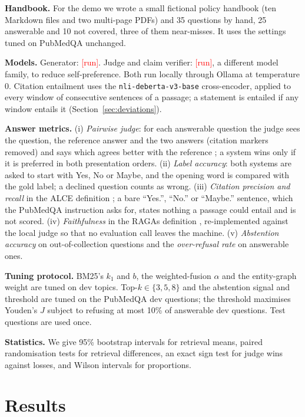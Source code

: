 \documentclass[11pt]{article}
\newcommand{\pending}{\textcolor{red}{[run]}}
\providecommand{\GeneratorModel}{\pending}\providecommand{\JudgeModel}{\pending}
\begin{document}
\textbf{Handbook.} For the demo we wrote a small fictional policy handbook (ten Markdown
files and two multi-page PDFs) and 35 questions by hand, 25 answerable and 10 not covered,
three of them near-misses. It uses the settings tuned on PubMedQA unchanged.

\textbf{Models.} Generator: \GeneratorModel. Judge and claim verifier: \JudgeModel, a
different model family, to reduce self-preference. Both run locally through Ollama at
temperature 0. Citation entailment uses the \texttt{nli-deberta-v3-base} cross-encoder, applied
to every window of \NliWindow{} consecutive sentences of a passage; a statement is entailed if
any window entails it (Section~\ref{sec:deviations}).

\textbf{Answer metrics.} (i) \emph{Pairwise judge}: for each answerable question the judge
sees the question, the reference answer and the two answers (citation markers removed) and
says which agrees better with the reference \citep{zheng2023judging}; a system wins only if
it is preferred in both presentation orders. (ii) \emph{Label accuracy}: both systems are
asked to start with Yes, No or Maybe, and the opening word is compared with the gold label; a
declined question counts as wrong. (iii) \emph{Citation precision and recall} in the ALCE
definition \citep{gao2023alce}; a bare ``Yes.'', ``No.'' or ``Maybe.'' sentence, which the
PubMedQA instruction asks for, states nothing a passage could entail and is not scored. (iv) \emph{Faithfulness} in the RAGAs definition
\citep{es2024ragas}, re-implemented against the local judge so that no evaluation call leaves
the machine. (v) \emph{Abstention accuracy} on out-of-collection questions and the
\emph{over-refusal rate} on answerable ones.

\textbf{Tuning protocol.} BM25's $k_1$ and $b$, the weighted-fusion $\alpha$ and the
entity-graph weight are tuned on dev topics. Top-$k\in\{3,5,8\}$ and the abstention signal and
threshold are tuned on the PubMedQA dev questions; the threshold maximises Youden's $J$
subject to refusing at most 10\% of answerable dev questions. Test questions are used once.

\textbf{Statistics.} We give 95\% bootstrap intervals for retrieval means, paired
randomisation tests for retrieval differences, an exact sign test for judge wins against
losses, and Wilson intervals for proportions.

\section{Results}
\end{document}

